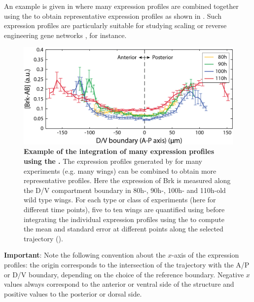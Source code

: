 An example is given in  where many expression profiles are combined together using the \wingjMatlab to obtain representative expression profiles as shown in . Such expression profiles are particularly suitable for studying scaling \autocite{de2010precision,hamaratoglu2011dpp} or reverse engineering gene networks \autocite{jaeger2004dynamic,perkins2006reverse}, for instance.\\

\begin{figure}[!h]
\centering
\includegraphics[scale=1]{images/brkAB_profile_for_user_manual.jpg}
\caption{\textbf{Example of the integration of many expression profiles using the \wingjMatlab.} The expression profiles generated by \wingj for many experiments (e.g. many wings) can be combined to obtain more representative profiles. Here the expression of Brk is measured along the D/V compartment boundary in 80h-, 90h-, 100h- and 110h-old wild type wings. For each type or class of experiments (here for different time points), five to ten wings are quantified using \wingj before integrating the individual expression profiles using the \wingjMatlab to compute the mean and standard error at different points along the selected trajectory ().}
\label{fig:wingj_expression_profiles_demo}
\end{figure}

\textbf{Important}: Note the following convention about the $x$-axis of the expression profiles: the origin corresponds to the intersection of the trajectory with the A/P or D/V boundary, depending on the choice of the reference boundary. Negative $x$ values always correspond to the anterior or ventral side of the structure and positive values to the posterior or dorsal side.

